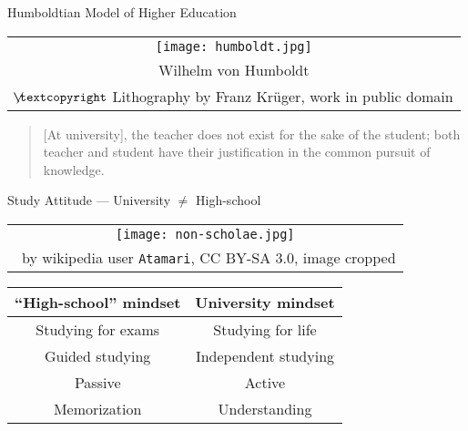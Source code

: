\begin{frame}{Humboldtian Model of Higher Education}

		\begin{center}
			\begin{tabular}{c}
			 	\texttt{[image: humboldt.jpg]}\\
				Wilhelm von Humboldt\\
				{\tiny $\not\hspace{-1ex}\textcopyright$ Lithography by Franz Kr\"uger, work in public domain}
			\end{tabular}
		\end{center}

		\begin{quote}
			[At university], the teacher does not exist for the sake of the student; both teacher and student have their justification in the common pursuit of knowledge.
		\end{quote}

\end{frame}

\begin{frame}{Study Attitude ---  University $\neq$ High-school}

	\begin{center}
			\begin{tabular}{c}
			 	\texttt{[image: non-scholae.jpg]}\\
				{\tiny \textcopyright~by wikipedia user \texttt{Atamari}, CC BY-SA 3.0, image cropped}
			\end{tabular}
		\end{center}

	\begin{center}
		\begin{tabular}{ c | c }
		``High-school'' mindset & University mindset\\\hline
		Studying for exams & Studying for life\\
		Guided studying & Independent studying\\
		Passive & Active\\
		Memorization & Understanding\\

		\end{tabular}
	\end{center}

\end{frame}

